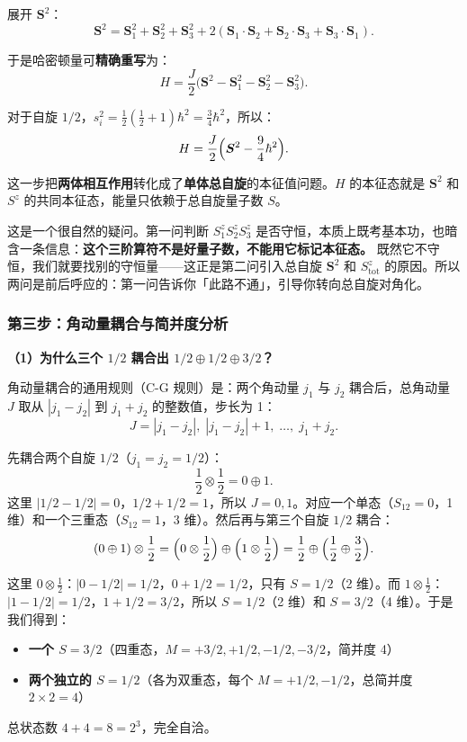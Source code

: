展开 $\bm{S}^2$：
\[
\bm{S}^2 = \bm{S}_1^2 + \bm{S}_2^2 + \bm{S}_3^2 + 2(\bm{S}_1 \cdot \bm{S}_2 + \bm{S}_2 \cdot \bm{S}_3 + \bm{S}_3 \cdot \bm{S}_1).
\]

于是哈密顿量可\textbf{精确重写}为：
\[
\boxed{H = \frac{J}{2}\bigl(\bm{S}^2 - \bm{S}_1^2 - \bm{S}_2^2 - \bm{S}_3^2\bigr)}.
\]

对于自旋 $1/2$，$s_i^2 = \frac{1}{2}(\frac{1}{2}+1)\hbar^2 = \frac{3}{4}\hbar^2$，所以：
\[
H = \frac{J}{2}\Bigl(\bm{S}^2 - \frac{9}{4}\hbar^2\Bigr).
\]

\begin{insightbox}[关键观察]
这一步把\textbf{两体相互作用}转化成了\textbf{单体总自旋}的本征值问题。$H$ 的本征态就是 $\bm{S}^2$ 和 $S^z$ 的共同本征态，能量只依赖于总自旋量子数 $S$。
\end{insightbox}

\begin{insightbox}[第一问和后面的关系]
这是一个很自然的疑问。第一问判断 $S_1^z S_2^z S_3^z$ 是否守恒，本质上既考基本功，也暗含一条信息：\textbf{这个三阶算符不是好量子数，不能用它标记本征态。} 既然它不守恒，我们就要找别的守恒量——这正是第二问引入总自旋 $\bm{S}^2$ 和 $S_{\text{tot}}^z$ 的原因。所以两问是前后呼应的：第一问告诉你「此路不通」，引导你转向总自旋对角化。
\end{insightbox}

\subsubsection{第三步：角动量耦合与简并度分析}

\textbf{（1）为什么三个 $1/2$ 耦合出 $1/2 \oplus 1/2 \oplus 3/2$？}

角动量耦合的通用规则（C-G 规则）是：两个角动量 $j_1$ 与 $j_2$ 耦合后，总角动量 $J$ 取从 $|j_1-j_2|$ 到 $j_1+j_2$ 的整数值，步长为 1：
\[
J = |j_1-j_2|,\; |j_1-j_2|+1,\; \dots,\; j_1+j_2.
\]

先耦合两个自旋 $1/2$（$j_1=j_2=1/2$）：
\[
\frac{1}{2} \otimes \frac{1}{2} = 0 \oplus 1.
\]
这里 $|1/2-1/2|=0$，$1/2+1/2=1$，所以 $J=0,1$。对应一个单态（$S_{12}=0$，1 维）和一个三重态（$S_{12}=1$，3 维）。然后再与第三个自旋 $1/2$ 耦合：
\[
(0 \oplus 1) \otimes \frac{1}{2} = \Bigl(0 \otimes \frac{1}{2}\Bigr) \oplus \Bigl(1 \otimes \frac{1}{2}\Bigr) = \frac{1}{2} \oplus \Bigl(\frac{1}{2} \oplus \frac{3}{2}\Bigr).
\]

这里 $0 \otimes \frac{1}{2}$：$|0-1/2|=1/2$，$0+1/2=1/2$，只有 $S=1/2$（2 维）。而 $1 \otimes \frac{1}{2}$：$|1-1/2|=1/2$，$1+1/2=3/2$，所以 $S=1/2$（2 维）和 $S=3/2$（4 维）。于是我们得到：
\begin{itemize}[nosep]
    \item \textbf{一个 $S=3/2$}（四重态，$M=+3/2,+1/2,-1/2,-3/2$，简并度 4）
    \item \textbf{两个独立的 $S=1/2$}（各为双重态，每个 $M=+1/2,-1/2$，总简并度 $2\times 2=4$）
\end{itemize}
总状态数 $4+4=8=2^3$，完全自洽。

